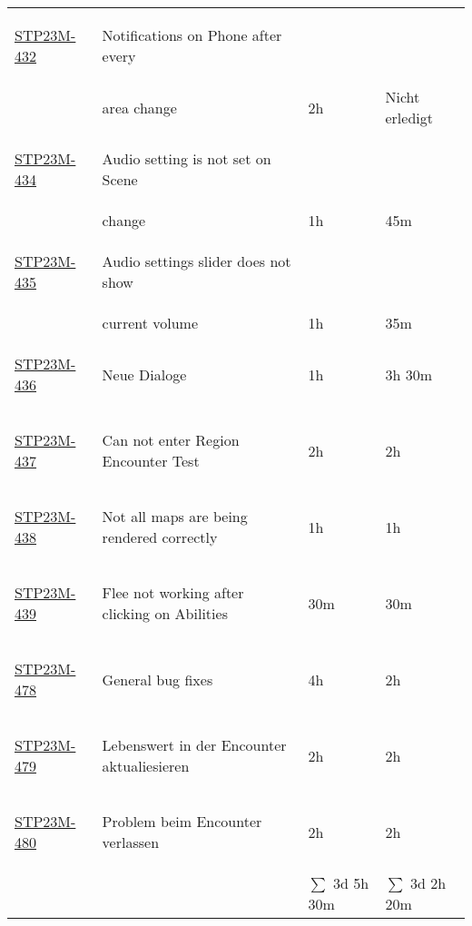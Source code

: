 \begin{longtable}{|l|l|l|l|}
    \hypertarget{T432}{\hyperlink{S432}{STP23M-432}} & Notifications on Phone after every & & \\
    & area change & 2h & Nicht erledigt \\
    \hypertarget{T434}{\hyperlink{S434}{STP23M-434}} & Audio setting is not set on Scene & & \\ 
    & change & 1h & 45m \\
    \hypertarget{T435}{\hyperlink{S435}{STP23M-435}} & Audio settings slider does not show & & \\
    & current volume & 1h & 35m \\
    \hypertarget{T436}{\hyperlink{S436}{STP23M-436}} & Neue Dialoge & 1h & 3h 30m \\
    \hypertarget{T437}{\hyperlink{S437}{STP23M-437}} & Can not enter Region Encounter Test & 2h & 2h \\
    \hypertarget{T438}{\hyperlink{S438}{STP23M-438}} & Not all maps are being rendered correctly & 1h & 1h \\
    \hypertarget{T439}{\hyperlink{S439}{STP23M-439}} & Flee not working after clicking on Abilities & 30m & 30m \\
    \hypertarget{T478}{\hyperlink{S478}{STP23M-478}} & General bug fixes & 4h & 2h \\
    \hypertarget{T479}{\hyperlink{S479}{STP23M-479}} & Lebenswert in der Encounter aktualiesieren & 2h & 2h \\
    \hypertarget{T480}{\hyperlink{S480}{STP23M-480}} & Problem beim Encounter verlassen & 2h & 2h \\
    
    \hline
    & & $\sum$ 3d 5h 30m & $\sum$ 3d 2h 20m \\
\end{longtable}
